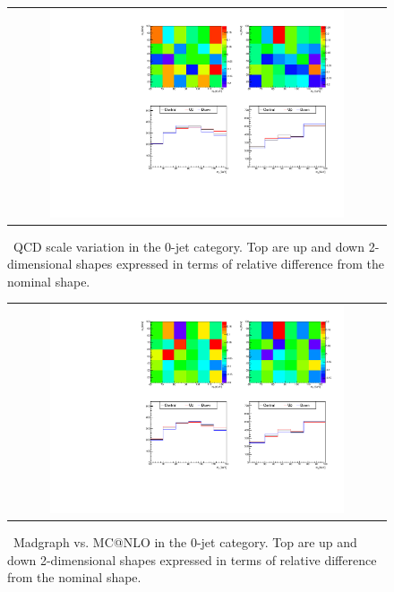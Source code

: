 %
\begin{figure}[htp]
\centering
\begin{tabular}{c}
\includegraphics[width=0.8\textwidth]{figures/histo_qqWW_CMS_hww_MVAWWNLOBounding_0j_zoom.pdf}
\end{tabular}
\caption{ \qqww\ QCD scale variation in the 0-jet category.
         Top are up and down 2-dimensional shapes expressed in terms of relative 
         difference from the nominal shape.}
\label{fig:alter_qqwwnlo}
\end{figure}
%
\begin{figure}[htp]
\centering
\begin{tabular}{c}
\includegraphics[width=0.8\textwidth]{figures/histo_qqWW_CMS_hww_MVAWWBounding_0j_zoom.pdf}
\end{tabular}
\caption{ \qqww\ Madgraph vs. MC@NLO in the 0-jet category.
         Top are up and down 2-dimensional shapes expressed in terms of relative 
         difference from the nominal shape.}
\label{fig:alter_qqww}
\end{figure}
%
